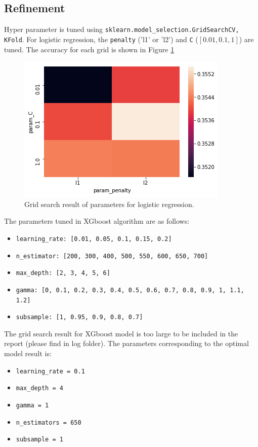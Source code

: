 \documentclass[12pt]{article}
\begin{document}
\subsection{Refinement}
Hyper parameter is tuned using \verb|sklearn.model_selection.GridSearchCV, KFold|.
For logistic regression, the \verb|penalty| ('l1' or 'l2') and \verb|C| ($[0.01, 0.1, 1]$) are tuned. The accuracy for each grid is shown in Figure \ref{fig:logit}

\begin{figure}[ht]
\includegraphics[scale=0.6]{figure/logit_parameter.png}
\centering
\caption{Grid search result of parameters for logistic regression.}
\label{fig:logit}
\end{figure}

The parameters tuned in XGboost algorithm are as follows:
\begin{itemize}
\item \verb|learning_rate: [0.01, 0.05, 0.1, 0.15, 0.2]|
\item \verb|n_estimator: [200, 300, 400, 500, 550, 600, 650, 700]|
\item \verb|max_depth: [2, 3, 4, 5, 6]|
\item \verb|gamma: [0, 0.1, 0.2, 0.3, 0.4, 0.5, 0.6, 0.7, 0.8, 0.9, 1, 1.1, 1.2]| 
\item \verb|subsample: [1, 0.95, 0.9, 0.8, 0.7]|
\end{itemize}
The grid search result for XGboost model is too large to be included in the report (please find in log folder). The parameters corresponding to the optimal model result is: 
\begin{itemize}
\item \verb|learning_rate = 0.1|
\item \verb|max_depth = 4|
\item \verb|gamma = 1|
\item \verb|n_estimators = 650|
\item \verb|subsample = 1|
\end{itemize}
\end{document}

